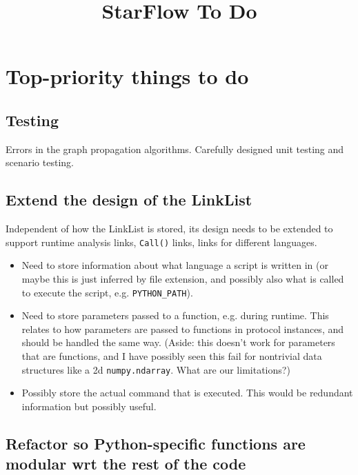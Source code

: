 \documentclass[11pt]{article}
\begin{document}
 

\title{StarFlow To Do}
\maketitle

\section{Top-priority things to do}

\subsection{Testing}
Errors in the graph propagation algorithms. Carefully designed unit testing and scenario testing. 

\subsection{Extend the design of the LinkList}
Independent of how the LinkList is stored, its design needs to be extended to support runtime 
analysis links, \verb|Call()| links, links for different languages.  

\begin{itemize}

	\item{Need to store information about what language a script is written in (or maybe this is 
	just inferred by file extension, and possibly also what is called to execute the script, e.g.
	\verb|PYTHON_PATH|).}
	
	\item{Need to store parameters passed to a function, e.g. during runtime.  This relates to how
	parameters are passed to functions in protocol instances, and should be handled the same way.
	(Aside:  this doesn't work for parameters that are functions, and I have possibly seen this
	fail for nontrivial data structures like a 2d \verb|numpy.ndarray|.  What are our limitations?)}
	
	\item{Possibly store the actual command that is executed.  This would be redundant information
	but possibly useful.}
	
\end{itemize}

\subsection{Refactor so Python-specific functions are modular wrt the rest of the code}
\end{document}
